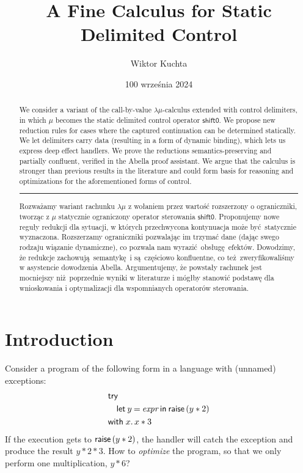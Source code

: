 \documentclass[a4paper, 11pt,titlepage, openright, twoside]{report}
\title{\textbf{A Fine Calculus for Static Delimited Control}}
\author{Wiktor Kuchta}
\date{100 września 2024} %
\newcommand{\shiftz}{\textsf{shift0}}
\newcommand{\keyword}[1]{\textsf{\textup{#1}}}
\newcommand{\KwWith}{\keyword{with}}
\newcommand{\KwRaise}{\keyword{raise}}
\newcommand{\Raise}{\KwRaise\,}
\newcommand{\KwTry}{\keyword{try}}
\newcommand{\Try}{\KwTry\;}
\newcommand{\Let}[3]{\keyword{let}\:#1\:\keyword{=}\:#2\:\keyword{in}\:#3}
\newcommand{\+}{\enspace}
\begin{document}
\maketitle


\thispagestyle{empty}
\cleardoublepage
\begin{abstract}
	We consider a variant of the call-by-value $λμ$-calculus extended with control delimiters,
	in which $μ$ becomes the static delimited control operator $\shiftz$.
	We propose new reduction rules for cases where the captured continuation can be determined statically.
	We let delimiters carry data (resulting in a form of dynamic binding), which lets us express deep effect handlers.
	We prove the reductions semantics-preserving and partially confluent,
	verified in the Abella proof assistant.
	We argue that the calculus is stronger than previous results in the literature and could form basis for
	reasoning and optimizations for the aforementioned forms of control.
%
	\begin{center} \rule[3pt]{300pt}{1pt} \end{center}
%
	Rozważamy wariant rachunku $λμ$ z wołaniem przez wartość rozszerzony
	o ograniczniki,
	tworząc z $μ$ statycznie ograniczony operator sterowania $\shiftz$.
	Proponujemy nowe reguły redukcji dla sytuacji,
	w których przechwycona kontynuacja może być statycznie wyznaczona.
	Rozszerzamy ograniczniki pozwalając im trzymać dane
	(dając swego rodzaju wiązanie dynamiczne),
	co pozwala nam wyrazić obsługę efektów.
	Dowodzimy, że redukcje zachowują semantykę i są częściowo konfluentne,
	co też zweryfikowaliśmy w asystencie dowodzenia Abella.
	Argumentujemy, że powstały rachunek jest mocniejszy niż poprzednie wyniki w literaturze
	i mógłby stanowić podstawę dla wnioskowania i optymalizacji dla wspomnianych operatorów sterowania.

\end{abstract}


\thispagestyle{empty}
\cleardoublepage
\setcounter{page}{5}
\tableofcontents


\chapter{Introduction}
Consider a program of the following form in a language with (unnamed) exceptions:
\begin{align*}
	&\Try \\
	&\quad \Let{y}{\textit{expr}}{\Raise (y*2)} \\
	&\KwWith\; x.\,x*3
\end{align*}
If the execution gets to $\Raise (y*2)$, the handler will catch the exception and produce the result $y*2*3$.
How to \textit{optimize} the program, so that we only perform one multiplication, $y*6$?
\end{document}
